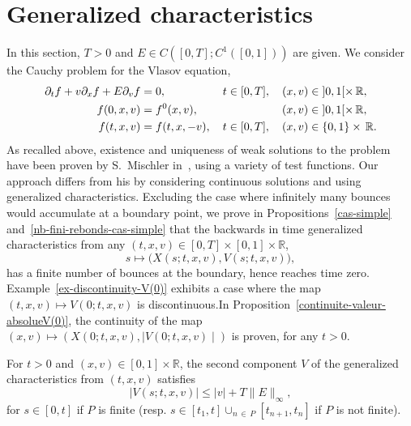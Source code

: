 \documentclass[AHL,Unicode,longabstracts,published]{cedram}
\newcommand{\R}{\mathbb{R}}
\begin{document}
\section{Generalized characteristics}\label{generalized-characteristics}

In this section, $T>0$ and $E\in C([0,T] ; C^1([0,1]))$ are given. We consider the Cauchy problem for the Vlasov equation,
\begin{align}
\partial_t f+ v \partial_x f+ E\partial_v f &= 0, \mkern90mu t\in [0,T],\quad (x,v) \in\;]0,1[\times \,\R, \label{VP-f-2}
\\
f(0,x,v) &= f^0(x,v), \mkern133mu (x,v) \in\;]0,1[\times \,\R, \label{init-f-2}
\\
f(t,x,v) &= f(t,x,-v), \quad t\in [0,T], \quad (x,v) \in \{ 0,1\} \times \,\R. \label{boundaries-f-2}
\end{align}
As recalled above, existence and uniqueness of weak solutions to the problem have been proven by S.~Mischler in~\cite{Mis99}, using a variety of test functions. Our appr\-oach differs from his by considering continuous solutions and using generalized characteristics. Excluding the case where infinitely many bounces would accumulate at a boundary point, we prove in Propositions~\ref{cas-simple} and~\ref{nb-fini-rebonds-cas-simple} that the backwards in time generalized characteristics from any $(t,x,v)\in [0,T]
\times [0,1] \times \R$,
\[
s \mapsto \big(X(s;t,x,v), V(s;t,x,v)\big),
\]
has a finite number of bounces at the boundary, hence reaches time zero. Example~\ref{ex-discontinuity-V(0)} exhibits a case where the map $(t,x,v)\mapsto V(0;t,x,v)$ is discontinuous.\linebreak In Proposition~\ref{continuite-valeur-absolueV(0)}, the continuity of the map $(x,v) \mapsto (X(0;t,x,v), \mid V(0;t,x,v)\mid)$ is proven, for any $t>0$.

\begin{lemm}\label{V-bounded}
For $t>0$ and $(x,v)\in [0,1] \times \R$, the second component $V$ of the generalized characteristics from $(t,x,v)$ satisfies
\begin{equation}\label{v_bounded}
\left| V(s;t,x,v) \right| \leq |v| + T \| E \|_{\infty},
\end{equation}
for $s\in [0,t]$ if $P$ is finite (resp. $s\in [t_1,t] \cup _{n\,\in\,P}[t_{n+1},t_n] $ if $P$ is not finite).
\end{lemm}
\end{document}
